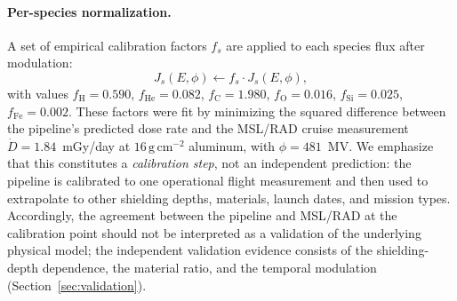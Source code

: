 \paragraph{Per-species normalization.}
\label{sec:calib}
A set of empirical calibration factors $f_s$ are applied to each species
flux after modulation:
\begin{equation}
  J_s(E, \phi) \leftarrow f_s \cdot J_s(E, \phi),
  \label{eq:calib}
\end{equation}
with values $f_\mathrm{H} = 0.590$, $f_\mathrm{He} = 0.082$,
$f_\mathrm{C} = 1.980$, $f_\mathrm{O} = 0.016$,
$f_\mathrm{Si} = 0.025$, $f_\mathrm{Fe} = 0.002$.
These factors were fit by minimizing the squared difference between the
pipeline's predicted dose rate and the MSL/RAD cruise measurement
$\dot{D} = 1.84$~mGy/day at $16\,\mathrm{g\,cm^{-2}}$ aluminum,
with $\phi = 481$~MV.
We emphasize that this constitutes a \emph{calibration step}, not an
independent prediction: the pipeline is calibrated to one operational
flight measurement and then used to extrapolate to other shielding
depths, materials, launch dates, and mission types.
Accordingly, the agreement between the pipeline and MSL/RAD at the
calibration point should not be interpreted as a validation of the
underlying physical model; the independent validation evidence consists
of the shielding-depth dependence, the material ratio, and the temporal
modulation (Section~\ref{sec:validation}).

